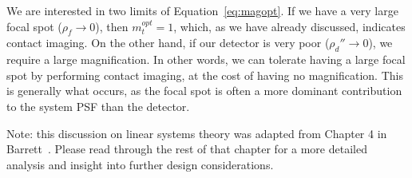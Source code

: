 \documentclass[mphy386-notes.tex]{subfiles}
\begin{document}
We are interested in two limits of Equation~\ref{eq:magopt}. If we have a very
large focal spot ($\rho_f \to 0$), then $m_t^{opt} = 1$, which, as we have already
discussed, indicates contact imaging. On the other hand, if our detector is very
poor ($\rho_d'' \to 0$), we require a large magnification. In other words, we can
tolerate having a large focal spot by performing contact imaging, at the cost of
having no magnification. This is generally what occurs, as the focal spot is
often a more dominant contribution to the system PSF than the detector.

Note: this discussion on linear systems theory was adapted from Chapter 4 in
Barrett~\cite{barrett}. Please read through the rest of that chapter for a more
detailed analysis and insight into further design considerations. 

\pagebreak
\end{document}
